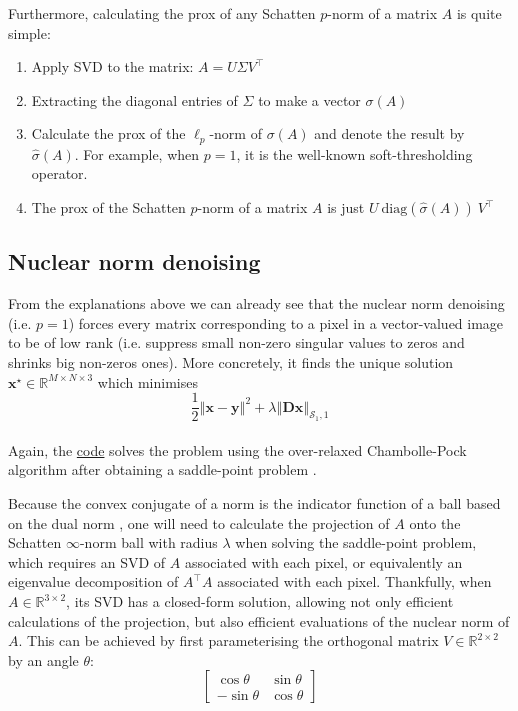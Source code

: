 \documentclass{article}
\begin{document}
Furthermore, calculating the prox of any Schatten \(p\)-norm of a matrix \(A\) is quite simple:
\begin{enumerate}
    \item Apply SVD to the matrix: \(A = U \Sigma V^\top\)
    \item Extracting the diagonal entries of \(\Sigma\) to make a vector \(\sigma\left(A\right)\)
    \item Calculate the prox of the \(\ell_p\)-norm of \(\sigma\left(A\right)\) and denote the result by \(\hat{\sigma}\left(A\right)\). For example, when \(p=1\), it is the well-known soft-thresholding operator.
    \item The prox of the Schatten \(p\)-norm of a matrix \(A\) is just \(U \  \text{diag}\left(\hat{\sigma}\left(A\right)\right) \  V^\top\)
\end{enumerate}

\subsection*{Nuclear norm denoising} \label{sec:tnv_denoising}
From the explanations above we can already see that the nuclear norm denoising (i.e. \(p=1\)) forces every matrix corresponding to a pixel in a vector-valued image to be of low rank (i.e. suppress small non-zero singular values to zeros and shrinks big non-zeros ones). More concretely, it finds the unique solution \(\mathbf{x}^\star \in \mathbb{R}^{M \times N \times 3}\) which minimises\\
%
\[\frac{1}{2} \left\Vert \mathbf{x}-\mathbf{y} \right\Vert ^2 + \lambda \left\Vert \mathbf{D}\mathbf{x} \right\Vert_{\mathcal{S}_1,1}\]\\
%
Again, the \href{https://github.com/tedyiningding/Image-Denoising/blob/main/TNVdenoise.m}{code} solves the problem using the over-relaxed Chambolle-Pock algorithm \cite[Algorithm 3.1]{condat2013primal} after obtaining a saddle-point problem \cite[Sec. 7.3.]{chambolle2016introduction}.

Because the convex conjugate of a norm is the indicator function of a ball based on the dual norm \cite[Sec. 6.5]{parikh2014proximal}, one will need to calculate the projection of \(A\) onto the Schatten \(\infty\)-norm ball with radius \(\lambda\) when solving the saddle-point problem, which requires an SVD of \(A\) associated with each pixel, or equivalently an eigenvalue decomposition of \(A^{\top}A\) associated with each pixel. Thankfully, when \(A \in \mathbb{R}^{3 \times 2}\), its SVD has a closed-form solution, allowing not only efficient calculations of the projection, but also efficient evaluations of the nuclear norm of \(A\). This can be achieved by first parameterising the orthogonal matrix \(V \in \mathbb{R}^{2 \times 2}\) by an angle \(\theta\):\\
%
\[\begin{bmatrix}
\cos \theta & \sin \theta\\
-\sin \theta & \cos \theta
\end{bmatrix}\]
\end{document}
